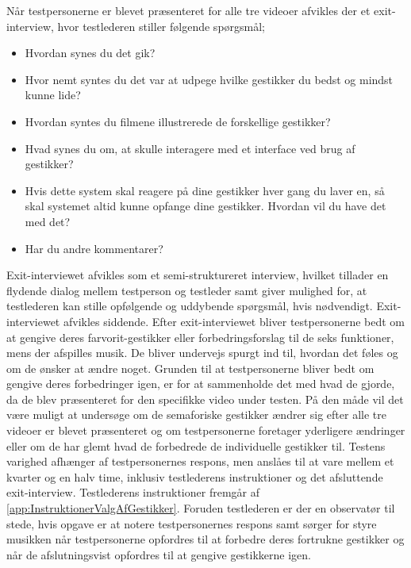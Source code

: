 Når testpersonerne er blevet præsenteret for alle tre videoer afvikles der et exit-interview, hvor testlederen stiller følgende spørgsmål; \blankline
%
\begin{itemize}
  \item Hvordan synes du det gik? 
  \item Hvor nemt syntes du det var at udpege hvilke gestikker du bedst og mindst kunne lide? 
  \item Hvordan syntes du filmene illustrerede de forskellige gestikker? 
  \item Hvad synes du om, at skulle interagere med et interface ved brug af gestikker? 
  \item Hvis dette system skal reagere på dine gestikker hver gang du laver en, så skal systemet altid kunne opfange dine gestikker. Hvordan vil du have det med det? 
  \item Har du andre kommentarer?\blankline
\end{itemize}
\noindent
%
Exit-interviewet afvikles som et semi-struktureret interview, hvilket tillader en flydende dialog mellem testperson og testleder samt giver mulighed for, at testlederen kan stille opfølgende og uddybende spørgsmål, hvis nødvendigt. Exit-interviewet afvikles siddende. Efter exit-interviewet bliver testpersonerne bedt om at gengive deres farvorit-gestikker eller forbedringsforslag til de seks funktioner, mens der afspilles musik. De bliver undervejs spurgt ind til, hvordan det føles og om de ønsker at ændre noget. Grunden til at testpersonerne bliver bedt om gengive deres forbedringer igen, er for at sammenholde det med hvad de gjorde, da de blev præsenteret for den specifikke video under testen. På den måde vil det være muligt at undersøge om de semaforiske gestikker ændrer sig efter alle tre videoer er blevet præsenteret og om testpersonerne foretager yderligere ændringer eller om de har glemt hvad de forbedrede de individuelle gestikker til. \blankline   
%
Testens varighed afhænger af testpersonernes respons, men anslåes til at vare mellem et kvarter og en halv time, inklusiv testlederens instruktioner og det afsluttende exit-interview. Testlederens instruktioner fremgår af \autoref{app:InstruktionerValgAfGestikker}. Foruden testlederen er der en observatør til stede, hvis opgave er at notere testpersonernes respons samt sørger for styre musikken når testpersonerne opfordres til at forbedre deres fortrukne gestikker og når de afslutningsvist opfordres til at gengive gestikkerne igen. 
%
